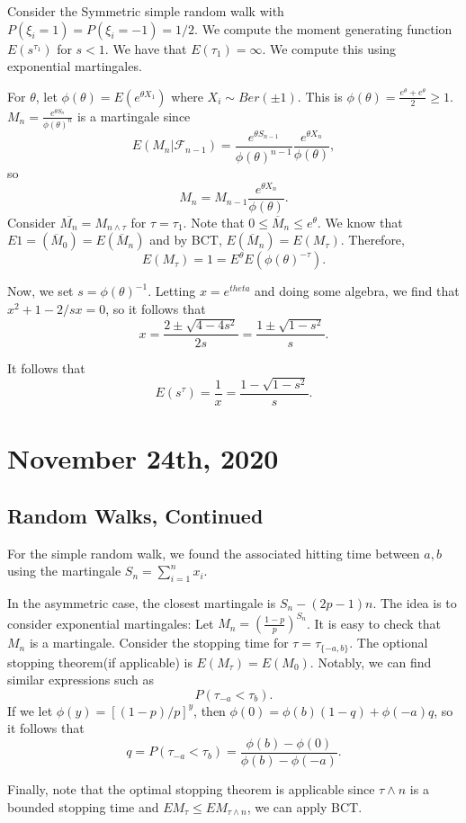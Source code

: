 \documentclass[11pt]{scrartcl}
\let \mc \mathcal
\let \ov \overline
\begin{document}
Consider the Symmetric simple random walk with $P(\xi_i = 1) = P(\xi_i = -1) = 1/2$.  We compute the moment generating function $E(s^{\tau_1})$ for $s < 1$.  We have that $E(\tau_1) = \infty$.  We compute this using exponential martingales.

For $\theta$, let $\phi(\theta) = E(e^{\theta X_1})$ where $X_i \sim Ber(\pm 1)$. This is $\phi(\theta) = \frac{e^{\theta} + e^{\theta}}{2} \ge 1$.  $M_n = \frac{e^{\theta S_n}}{\phi(\theta)^n}$ is a martingale since 
$$E(M_n|\mc F_{n-1}) = \frac{e^{\theta S_{n-1}}}{\phi(\theta)^{n-1}} \frac{e^{\theta X_n} }{\phi(\theta)},$$
so
$$M_n = M_{n-1} \frac{e^{\theta X_n} }{\phi(\theta)}.$$
Consider $\ov{M_n} = M_{n \wedge \tau}$ for $\tau = \tau_1$.  Note that $0 \le \ov M_n \le e^{\theta}$.  We know that $E1 = (\ov M_0) = E(\ov M_n)$ and by BCT, $E(\ov M_n) = E(M_\tau).$ Therefore, $$E(M_\tau) = 1 = E^{\theta}E(\phi(\theta)^{-\tau}).$$

Now, we set $s = \phi(\theta)^{-1}$. Letting $x = e^{theta}$ and doing some algebra, we find that $x^2 + 1 - 2/s x = 0$, so it follows that 
$$x = \frac{2 \pm \sqrt{4 - 4s^2}}{2s} = \frac{1 \pm \sqrt{1-s^2}}{s}.$$

It follows that $$E(s^{\tau}) = \frac{1}{x} = \frac{1 - \sqrt{1 - s^2}}{s}.$$
\pagebreak
\section{November 24th, 2020}
\subsection{Random Walks, Continued}
For the simple random walk, we found the associated hitting time between $a, b$ using the martingale $S_n = \sum_{i=1}^n x_i$.

In the asymmetric case, the closest martingale is $S_n - (2p-1)n$.  The idea is to consider exponential martingales:  Let $M_n = \left (\frac{1-p}{p}\right )^{S_n}$.  It is easy to check that $M_n$ is a martingale.  Consider the stopping time for $\tau = \tau_{\{-a, b\}}.$  The optional stopping theorem(if applicable) is $E(M_\tau) = E(M_0)$.  Notably, we can find similar expressions such as 
$$P(\tau_{-a} < \tau_b).$$
If we let $\phi(y) = [(1-p)/p]^y$, then $\phi(0) = \phi(b)(1-q) + \phi(-a) q$, so it follows that 
$$q = P(\tau_{-a} < \tau_b) = \frac{\phi(b) - \phi(0)}{\phi(b) - \phi(-a)}.$$

Finally, note that the optimal stopping theorem is applicable since $\tau \wedge n$ is a bounded stopping time and $EM_\tau \le EM_{\tau\wedge n}$, we can apply BCT.
\end{document}
